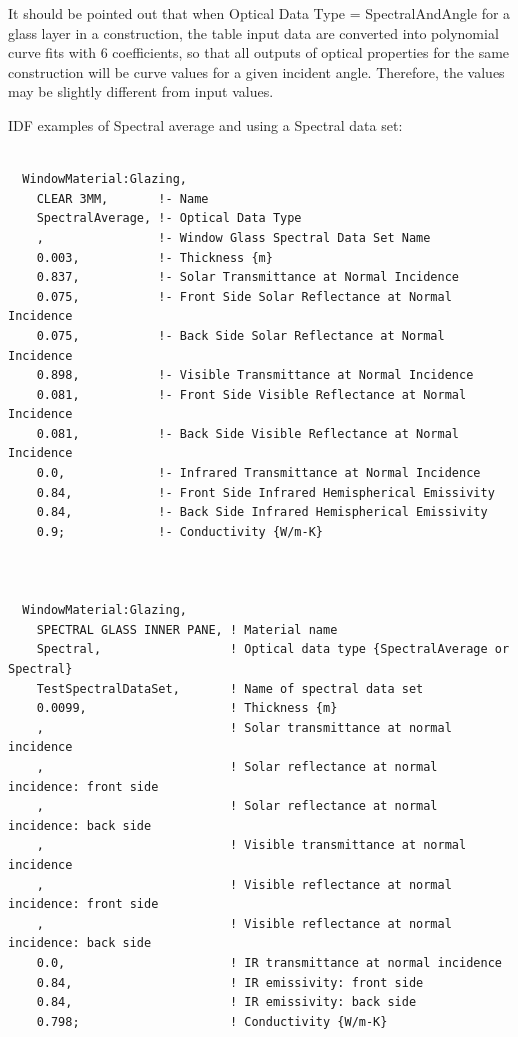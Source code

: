 It should be pointed out that when Optical Data Type = SpectralAndAngle for a glass layer in a construction, the table input data are converted into polynomial curve fits with 6 coefficients, so that all outputs of optical properties for the same construction will be curve values for a given incident angle. Therefore, the values may be slightly different from input values.

IDF examples of Spectral average and using a Spectral data set:

\begin{lstlisting}

  WindowMaterial:Glazing,
    CLEAR 3MM,       !- Name
    SpectralAverage, !- Optical Data Type
    ,                !- Window Glass Spectral Data Set Name
    0.003,           !- Thickness {m}
    0.837,           !- Solar Transmittance at Normal Incidence
    0.075,           !- Front Side Solar Reflectance at Normal Incidence
    0.075,           !- Back Side Solar Reflectance at Normal Incidence
    0.898,           !- Visible Transmittance at Normal Incidence
    0.081,           !- Front Side Visible Reflectance at Normal Incidence
    0.081,           !- Back Side Visible Reflectance at Normal Incidence
    0.0,             !- Infrared Transmittance at Normal Incidence
    0.84,            !- Front Side Infrared Hemispherical Emissivity
    0.84,            !- Back Side Infrared Hemispherical Emissivity
    0.9;             !- Conductivity {W/m-K}



  WindowMaterial:Glazing,
    SPECTRAL GLASS INNER PANE, ! Material name
    Spectral,                  ! Optical data type {SpectralAverage or Spectral}
    TestSpectralDataSet,       ! Name of spectral data set
    0.0099,                    ! Thickness {m}
    ,                          ! Solar transmittance at normal incidence
    ,                          ! Solar reflectance at normal incidence: front side
    ,                          ! Solar reflectance at normal incidence: back side
    ,                          ! Visible transmittance at normal incidence
    ,                          ! Visible reflectance at normal incidence: front side
    ,                          ! Visible reflectance at normal incidence: back side
    0.0,                       ! IR transmittance at normal incidence
    0.84,                      ! IR emissivity: front side
    0.84,                      ! IR emissivity: back side
    0.798;                     ! Conductivity {W/m-K}

\end{lstlisting}

